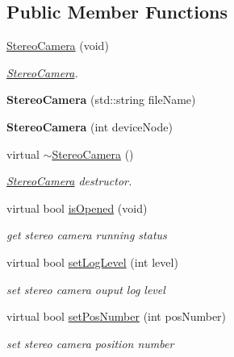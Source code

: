 \subsection*{Public Member Functions}
\begin{DoxyCompactItemize}
\item 
\hyperlink{class_stereo_camera_a6d9ac42b50dc07f5f846336ffd29e752}{Stereo\+Camera} (void)
\begin{DoxyCompactList}\small\item\em \hyperlink{class_stereo_camera}{Stereo\+Camera}. \end{DoxyCompactList}\item 
\mbox{\label{class_stereo_camera_ad5caa5f91c77562d8b6183ef153a943c}} 
{\bfseries Stereo\+Camera} (std\+::string file\+Name)
\item 
\mbox{\label{class_stereo_camera_a6e0d6591990e7f8d175d67e9609c8a4c}} 
{\bfseries Stereo\+Camera} (int device\+Node)
\item 
virtual \hyperlink{class_stereo_camera_a2b36ce592e0e2bf0850d37681c51ae60}{$\sim$\+Stereo\+Camera} ()
\begin{DoxyCompactList}\small\item\em \hyperlink{class_stereo_camera}{Stereo\+Camera} destructor. \end{DoxyCompactList}\item 
virtual bool \hyperlink{class_stereo_camera_a47c0d9ee727f13af5d348db9f217a44b}{is\+Opened} (void)
\begin{DoxyCompactList}\small\item\em get stereo camera running status \end{DoxyCompactList}\item 
virtual bool \hyperlink{class_stereo_camera_adb684170c2180eb2109f9eecd1723c1c}{set\+Log\+Level} (int level)
\begin{DoxyCompactList}\small\item\em set stereo camera ouput log level \end{DoxyCompactList}\item 
virtual bool \hyperlink{class_stereo_camera_ad570580bd5b16ac58831d57ffd23ce5b}{set\+Pos\+Number} (int pos\+Number)
\begin{DoxyCompactList}\small\item\em set stereo camera position number \end{DoxyCompactList}\item 

\end{DoxyCompactItemize}

